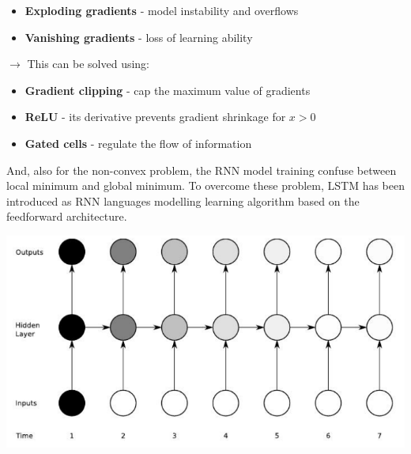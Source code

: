 \documentclass[letterpaper, 10.5pt,landscape]{article}
\begin{document}
\begin{multicols*}{3}
\begin{itemize}[label={--},leftmargin=4mm]
\vspace{-3pt}
\item \textbf{Exploding gradients} - model instability and overflows
\vspace{-3pt}
\item \textbf{Vanishing gradients} - loss of learning ability
\end{itemize}


$\rightarrow$ This can be solved using:
\begin{itemize}[label={--},leftmargin=4mm]
\vspace{-3pt}
\item \textbf{Gradient clipping} - cap the maximum value of gradients
\vspace{-3pt}
\item \textbf{ReLU} - its derivative prevents gradient shrinkage for $x > 0$
\vspace{-3pt}
\item \textbf{Gated cells} - regulate the flow of information
\end{itemize}

\vspace{3pt}

And, also for the non-convex problem, the RNN model training confuse between local minimum and global minimum. To overcome these problem, LSTM has been introduced as RNN languages modelling learning algorithm based on the feedforward architecture.

\vspace{-5pt}

\begin{center}
    \begin{minipage}{0.75\linewidth}
    \includegraphics[width=\textwidth]{figures/RNNBackprop.png}
    \end{minipage}
\end{center}


\end{multicols*}
\end{document}
